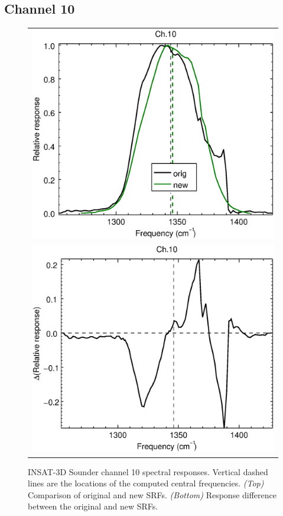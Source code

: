 \subsection{Channel 10}
\begin{figure}[H]
  \centering
  \begin{tabular}{c}
    \includegraphics[scale=0.55]{graphics/sndr/srf/sndr_insat3d-10.eps} \\
    \includegraphics[scale=0.55]{graphics/sndr/srf/sndr_insat3d-10.difference.eps}
  \end{tabular}
  \caption{INSAT-3D Sounder channel 10 spectral responses. Vertical dashed lines are the locations of the computed central frequencies. \emph{(Top)} Comparison of original and new SRFs. \emph{(Bottom)} Response difference between the original and new SRFs.}
  \label{fig:sndr_ch10}
\end{figure}


